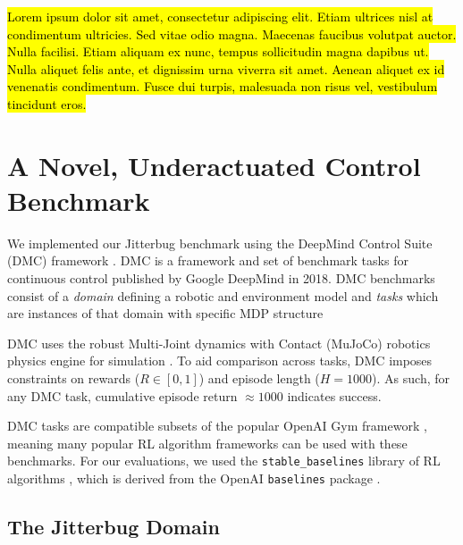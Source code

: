 \documentclass[letterpaper, 10 pt, conference]{ieeeconf}
\begin{document}
\hl{Lorem ipsum dolor sit amet, consectetur adipiscing elit. Etiam ultrices nisl at condimentum ultricies. Sed vitae odio magna. Maecenas faucibus volutpat auctor. Nulla facilisi. Etiam aliquam ex nunc, tempus sollicitudin magna dapibus ut. Nulla aliquet felis ante, et dignissim urna viverra sit amet. Aenean aliquet ex id venenatis condimentum. Fusce dui turpis, malesuada non risus vel, vestibulum tincidunt eros.}


\section{A Novel, Underactuated Control Benchmark}
We implemented our Jitterbug benchmark using the DeepMind Control Suite (DMC) framework \cite{Tassa2018DMC}.
DMC is a framework and set of benchmark tasks for continuous control published by Google DeepMind in 2018.
DMC benchmarks consist of a \emph{domain} defining a robotic and environment model and \emph{tasks} which are instances of that domain with specific MDP structure

DMC uses the robust Multi-Joint dynamics with Contact (MuJoCo) robotics physics engine for simulation \cite{Todorov2012MuJoCo}.
To aid comparison across tasks, DMC imposes constraints on rewards ($R \in [0, 1]$) and episode length ($H = 1000$).
As such, for any DMC task, cumulative episode return $\approx 1000$ indicates success.

DMC tasks are compatible subsets of the popular OpenAI Gym framework \cite{Brockman2016Gym}, meaning many popular RL algorithm frameworks can be used with these benchmarks.
For our evaluations, we used the \texttt{stable\_baselines} library of RL algorithms \cite{Hill2018Stable}, which is derived from the OpenAI \texttt{baselines} package \cite{Dhariwal2017Baselines}.

\subsection{The Jitterbug Domain}
\end{document}
